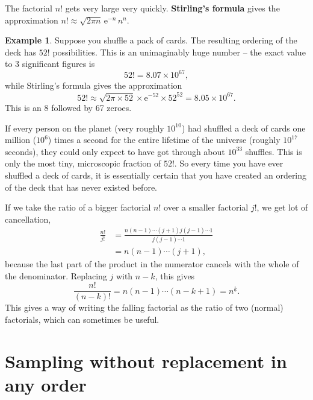 \documentclass[
  a4paper,
]{book}
\theoremstyle{definition}
\theoremstyle{definition}
\newtheorem{example}{Example}[chapter]
\theoremstyle{definition}
\theoremstyle{definition}
\theoremstyle{remark}
\begin{document}
The factorial \(n!\) gets very large very quickly. \textbf{Stirling's formula} gives the approximation
\(n! \approx \sqrt{2\pi n} \, \mathrm{e}^{-n} \, n^n\).

\begin{example}
Suppose you shuffle a pack of cards. The resulting ordering of the deck has \(52!\) possibilities. This is an unimaginably huge number -- the exact value to 3 significant figures is
\[ 52! = 8.07 \times 10^{67} , \]
while Stirling's formula gives the approximation
\[ 52! \approx \sqrt{2\pi \times 52} \times \mathrm{e}^{-52} \times 52^{52} = 8.05 \times 10^{67} . \]
This is an 8 followed by 67 zeroes.

If every person on the planet (very roughly \(10^{10}\)) had shuffled a deck of cards one million (\(10^6\)) times a second for the entire lifetime of the universe (roughly \(10^{17}\) seconds), they could only expect to have got through about \(10^{33}\) shuffles.
This is only the most tiny, microscopic fraction of \(52!\). So every time you have ever shuffled a deck of cards, it is essentially certain that you have created an ordering of the deck that has never existed before.
\end{example}

If we take the ratio of a bigger factorial \(n!\) over a smaller factorial \(j!\), we get lot of cancellation,
\begin{align*}
\frac{n!}{j!} &= \frac{n(n-1) \cdots(j+1)j(j-1) \cdots 1}{j(j-1) \cdots 1} \\
  &= n(n-1) \cdots (j+1) ,
\end{align*}
because the last part of the product in the numerator cancels with the whole of the denominator. Replacing \(j\) with \(n-k\), this gives
\[ \frac{n!}{(n-k)!} = n(n-1) \cdots (n - k + 1) = {n}^{\underline{k}} . \]
This gives a way of writing the falling factorial as the ratio of two (normal) factorials, which can sometimes be useful.

\hypertarget{combinations}{%
\section{Sampling without replacement in any order}\label{combinations}}
\end{document}
